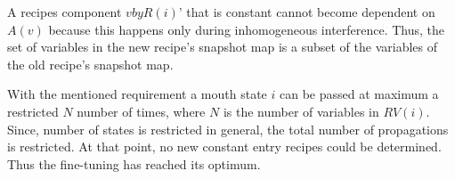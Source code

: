 \documentclass[12pt,a4paper]{scrartcl}
\theoremstyle{break}
\begin{document}
A recipes component $v by R(i)$' that is constant cannot become dependent on
$A(v)$ because this happens only during inhomogeneous interference. Thus, the
set of variables in the new recipe's snapshot map is a subset of the variables
of the old recipe's snapshot map.

With the mentioned requirement a mouth state $i$ can be passed at maximum a
restricted $N$ number of times, where $N$ is the number of variables in
$RV(i)$. Since, number of states is restricted in general, the total number of
propagations is restricted. At that point, no new constant entry recipes could
be determined. Thus the fine-tuning has reached its optimum.
\end{document}
